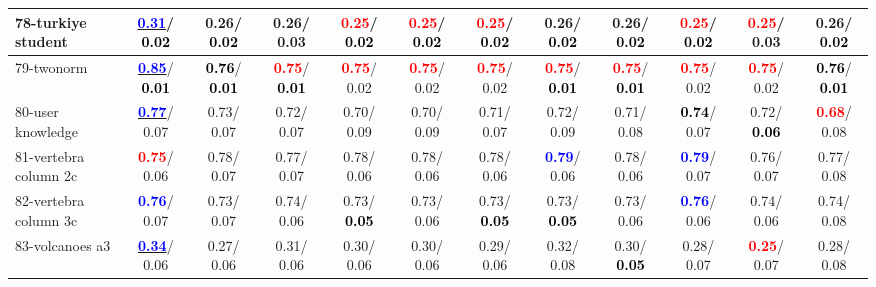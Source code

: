 \begin{table}[h]
\begin{center}
{\begin{tabular}{lc|c|c|c|c|c|c|c|c|c|c}
78-turkiye student & \underline{\textcolor{blue}{\textbf{  0.31}}}/\textcolor{black}{\textbf{  0.02}} &   0.26/\textcolor{black}{\textbf{  0.02}} &   0.26/  0.03 & \textcolor{red}{\textbf{  0.25}}/\textcolor{black}{\textbf{  0.02}} & \textcolor{red}{\textbf{  0.25}}/\textcolor{black}{\textbf{  0.02}} & \textcolor{red}{\textbf{  0.25}}/\textcolor{black}{\textbf{  0.02}} &   0.26/\textcolor{black}{\textbf{  0.02}} &   0.26/\textcolor{black}{\textbf{  0.02}} & \textcolor{red}{\textbf{  0.25}}/\textcolor{black}{\textbf{  0.02}} & \textcolor{red}{\textbf{  0.25}}/  0.03 &   0.26/\textcolor{black}{\textbf{  0.02}} \\ \hline
79-twonorm & \underline{\textcolor{blue}{\textbf{  0.85}}}/\textcolor{black}{\textbf{  0.01}} & \textcolor{black}{\textbf{  0.76}}/\textcolor{black}{\textbf{  0.01}} & \textcolor{red}{\textbf{  0.75}}/\textcolor{black}{\textbf{  0.01}} & \textcolor{red}{\textbf{  0.75}}/  0.02 & \textcolor{red}{\textbf{  0.75}}/  0.02 & \textcolor{red}{\textbf{  0.75}}/  0.02 & \textcolor{red}{\textbf{  0.75}}/\textcolor{black}{\textbf{  0.01}} & \textcolor{red}{\textbf{  0.75}}/\textcolor{black}{\textbf{  0.01}} & \textcolor{red}{\textbf{  0.75}}/  0.02 & \textcolor{red}{\textbf{  0.75}}/  0.02 & \textcolor{black}{\textbf{  0.76}}/\textcolor{black}{\textbf{  0.01}} \\
80-user knowledge & \underline{\textcolor{blue}{\textbf{  0.77}}}/  0.07 &   0.73/  0.07 &   0.72/  0.07 &   0.70/  0.09 &   0.70/  0.09 &   0.71/  0.07 &   0.72/  0.09 &   0.71/  0.08 & \textcolor{black}{\textbf{  0.74}}/  0.07 &   0.72/\textcolor{black}{\textbf{  0.06}} & \textcolor{red}{\textbf{  0.68}}/  0.08 \\
81-vertebra column 2c & \textcolor{red}{\textbf{  0.75}}/  0.06 &   0.78/  0.07 &   0.77/  0.07 &   0.78/  0.06 &   0.78/  0.06 &   0.78/  0.06 & \textcolor{blue}{\textbf{  0.79}}/  0.06 &   0.78/  0.06 & \textcolor{blue}{\textbf{  0.79}}/  0.07 &   0.76/  0.07 &   0.77/  0.08 \\
82-vertebra column 3c & \textcolor{blue}{\textbf{  0.76}}/  0.07 &   0.73/  0.07 &   0.74/  0.06 &   0.73/\textcolor{black}{\textbf{  0.05}} &   0.73/  0.06 &   0.73/\textcolor{black}{\textbf{  0.05}} &   0.73/\textcolor{black}{\textbf{  0.05}} &   0.73/  0.06 & \textcolor{blue}{\textbf{  0.76}}/  0.06 &   0.74/  0.06 &   0.74/  0.08 \\
83-volcanoes a3 & \underline{\textcolor{blue}{\textbf{  0.34}}}/  0.06 &   0.27/  0.06 &   0.31/  0.06 &   0.30/  0.06 &   0.30/  0.06 &   0.29/  0.06 &   0.32/  0.08 &   0.30/\textcolor{black}{\textbf{  0.05}} &   0.28/  0.07 & \textcolor{red}{\textbf{  0.25}}/  0.07 &   0.28/  0.08 \\

\end{tabular}}
\end{center}
\end{table}

